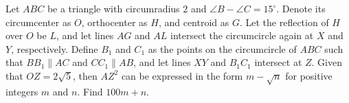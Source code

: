 Let $ABC$ be a triangle with circumradius $2$ and $\angle B-\angle C=15^\circ$. Denote its circumcenter as $O$, orthocenter as $H$, and centroid as $G$. Let the reflection of $H$ over $O$ be $L$, and let lines $AG$ and $AL$ intersect the circumcircle again at $X$ and $Y$, respectively. Define $B_1$ and $C_1$ as the points on the circumcircle of $ABC$ such that $BB_1\parallel AC$ and $CC_1\parallel AB$, and let lines $XY$ and $B_1C_1$ intersect at $Z$. Given that $OZ=2\sqrt 5$, then $AZ^2$ can be expressed in the form $m-\sqrt n$ for positive integers $m$ and $n$. Find $100m+n$.
